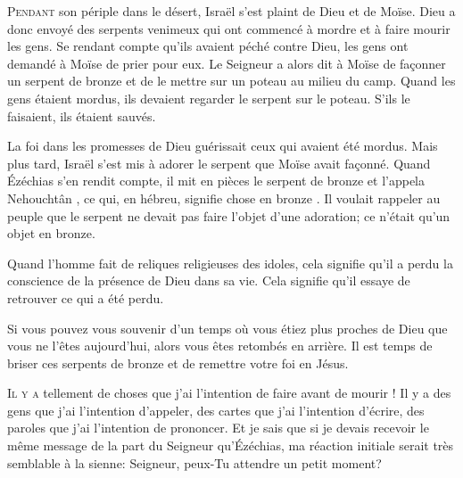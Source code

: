 \lettrine{P}{endant} son périple dans le désert, Israël s'est plaint
 de Dieu et de Moïse.
 Dieu a donc envoyé des serpents venimeux qui ont commencé à mordre
 et à faire mourir les gens.
 Se rendant compte qu'ils avaient péché contre Dieu,
 les gens ont demandé à Moïse de prier pour eux.
 Le Seigneur a alors dit à Moïse de fa\c{c}onner un serpent de bronze
 et de le mettre sur un poteau au milieu du camp.
 Quand les gens étaient mordus, ils devaient regarder le serpent
 sur le poteau. S'ils le faisaient, ils étaient sauvés. 

La foi dans les promesses de Dieu guérissait ceux qui avaient été mordus.
 Mais plus tard, Israël s'est mis à adorer le serpent
 que Moïse avait fa\c{c}onné. Quand Ézéchias s'en rendit compte,
 il mit en pièces le serpent de bronze et l'appela 
 \Og Nehouchtân \Fg{},
 ce qui, en hébreu, signifie \Og chose en bronze \Fg{}.
 Il voulait rappeler au peuple que le serpent ne devait pas faire
 l'objet d'une adoration; ce n'était qu'un objet en bronze. 

Quand l'homme fait de reliques religieuses des idoles,
 cela signifie qu'il a perdu la conscience de la présence de Dieu dans sa vie.
 Cela signifie qu'il essaye de retrouver ce qui a été perdu. 


Si vous pouvez vous souvenir d'un temps où vous étiez plus proches de Dieu
 que vous ne l'êtes aujourd'hui, alors vous êtes retombés en arrière.
 Il est temps de briser ces serpents de bronze et de remettre votre foi en Jésus. 

\dvrule






\lettrine{I}{l y a} tellement de choses que j'ai l'intention de faire
 avant de mourir ! Il y a des gens que j'ai l'intention d'appeler,
 des cartes que j'ai l'intention d'écrire, des paroles que j'ai l'intention
 de prononcer. Et je sais que si je devais recevoir le même message
 de la part du Seigneur qu'Ézéchias, ma réaction initiale serait très semblable
 à la sienne: \Og Seigneur, peux-Tu attendre un petit moment? \Fg{}

